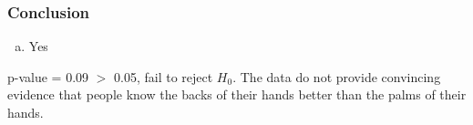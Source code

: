 
\begin{frame}
\frametitle{Conclusion}


\begin{enumerate}[(a)]
\item Yes
\end{enumerate}

p-value = 0.09 $>$ 0.05, fail to reject $H_0$. The data do not provide convincing evidence that people know the backs of their hands better than the palms of their hands.

\end{frame}

